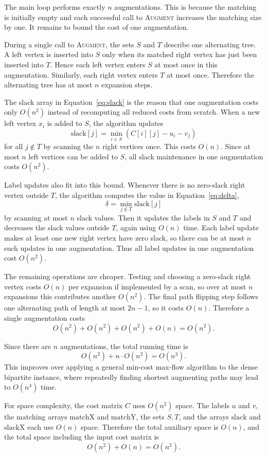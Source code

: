 \documentclass[acmsmall,nonacm]{acmart}
\theoremstyle{plain}
\theoremstyle{remark}
\begin{document}
The main loop performs exactly $n$ augmentations. This is because the matching
is initially empty and each successful call to \textsc{Augment} increases the
matching size by one. It remains to bound the cost of one augmentation.

During a single call to \textsc{Augment}, the sets $S$ and $T$ describe one
alternating tree. A left vertex is inserted into $S$ only when its matched right
vertex has just been inserted into $T$. Hence each left vertex enters $S$ at
most once in this augmentation. Similarly, each right vertex enters $T$ at most
once. Therefore the alternating tree has at most $n$ expansion steps.

The slack array in Equation~\ref{eq:slack} is the reason that one augmentation
costs only $O(n^2)$ instead of recomputing all reduced costs from scratch. When
a new left vertex $x_i$ is added to $S$, the algorithm updates
\[
    \text{slack}[j]
    =
    \min_{i\in S}(C[i][j]-u_i-v_j)
\]
for all $j\notin T$ by scanning the $n$ right vertices once. This costs
$O(n)$. Since at most $n$ left vertices can be added to $S$, all slack
maintenance in one augmentation costs $O(n^2)$.

Label updates also fit into this bound. Whenever there is no zero-slack right
vertex outside $T$, the algorithm computes the value in Equation~\ref{eq:delta},
\[
    \delta=\min_{j\notin T}\text{slack}[j]
\]
by scanning at most $n$ slack values. Then it updates the labels in $S$ and $T$
and decreases the slack values outside $T$, again using $O(n)$ time. Each label
update makes at least one new right vertex have zero slack, so there can be at
most $n$ such updates in one augmentation. Thus all label updates in one
augmentation cost $O(n^2)$.

The remaining operations are cheaper. Testing and choosing a zero-slack right
vertex costs $O(n)$ per expansion if implemented by a scan, so over at most
$n$ expansions this contributes another $O(n^2)$. The final path flipping step
follows one alternating path of length at most $2n-1$, so it costs $O(n)$.
Therefore a single augmentation costs
\[
    O(n^2)+O(n^2)+O(n^2)+O(n)=O(n^2).
\]

Since there are $n$ augmentations, the total running time is
\[
    O(n^2) + n\cdot O(n^2)=O(n^3).
\]
This improves over applying a general min-cost max-flow algorithm to the dense
bipartite instance, where repeatedly finding shortest augmenting paths may lead
to $O(n^4)$ time.

For space complexity, the cost matrix $C$ uses $O(n^2)$ space. The labels $u$
and $v$, the matching arrays $\text{matchX}$ and $\text{matchY}$, the sets
$S,T$, and the arrays $\text{slack}$ and $\text{slackX}$ each use $O(n)$ space.
Therefore the total auxiliary space is $O(n)$, and the total space including the
input cost matrix is
\[
    O(n^2)+O(n)=O(n^2).
\]
\end{document}
